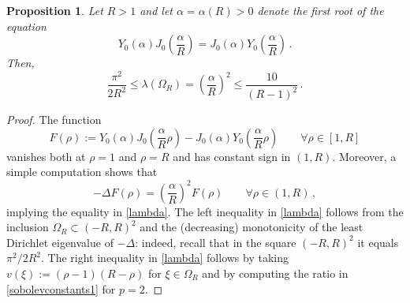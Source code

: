 \documentclass[a4paper,11pt]{article}
\newtheorem{proposition}[theorem]{Proposition}
\numberwithin{equation}{section}
\numberwithin{figure}{section}
\begin{document}
\begin{proposition}
Let $R>1$ and let $\alpha=\alpha(R)>0$ denote the first root of the equation
\begin{equation}\label{alfa}
Y_{0}(\alpha) J_{0} \left( \dfrac{\alpha}{R} \right) = J_{0}(\alpha) Y_{0} \left( \dfrac{\alpha}{R} \right) \, .
\end{equation}
Then,
\begin{equation}\label{lambda}
\dfrac{\pi^2}{2R^2}\le\lambda(\Omega_{R}) = \left( \dfrac{\alpha}{R} \right)^{2}\le \dfrac{10}{(R-1)^2}\, .
\end{equation}
\end{proposition}
\noindent
\begin{proof} The function
$$
F(\rho) := Y_{0}(\alpha) J_{0} \left( \dfrac{\alpha}{R} \rho \right) - J_{0}(\alpha) Y_{0} \left( \dfrac{\alpha}{R} \rho \right) \qquad
\forall \rho \in [1,R]
$$
vanishes both at $\rho =1$ and $\rho = R$ and has constant sign in $(1,R)$. Moreover, a simple computation shows that
$$
- \Delta F(\rho) = \left( \dfrac{\alpha}{R} \right)^{2} F(\rho) \qquad \forall \rho \in (1,R) \, ,
$$
implying the equality in \eqref{lambda}. The left inequality in \eqref{lambda} follows from the inclusion $\Omega_R\subset(-R,R)^2$ and the (decreasing) monotonicity of the
least Dirichlet eigenvalue of $-\Delta$: indeed, recall that in the square $(-R,R)^2$ it equals $\pi^2/2R^2$.
The right inequality in \eqref{lambda} follows by taking $v(\xi) := (\rho-1)(R-\rho)$ for $\xi \in \Omega_{R}$ and by computing the ratio in
\eqref{sobolevconstants1} for $p=2$.\end{proof}
\end{document}

